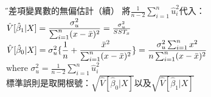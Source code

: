 \documentclass[xcolor=dvipsnames]{beamer}
\begin{document}
\begin{frame}{\H 誤差項變異數的無偏估計（續）}
將$ \frac{1}{n-2}\sum\limits_{i=1}^{n}\hat{u}_{i}^2 $代入：\\
$\hat{V}[\hat{\beta}_{1}|X]=\mathlarger{\frac{\sigma_{u}^{2}}{\sum_{i=1}^{n}(x-\bar{x})^2}}=\frac{\sigma_{u}^{2}}{SST_{x}}$\\
$\hat{V}[\hat{\beta}_{0}|X]=\sigma_{u}^{2}\mathlarger{\{\frac{1}{n}+\frac{\bar{x}^2}{\sum_{i=1}^{n}(x-\bar{x})^2}}\}=\mathlarger{\frac{\sigma_{u}^2\sum_{i=1}^{n}x^2}{n\sum_{i=1}^{n}(x-\bar{x})^2}}$\\
$\mathrm{where}$ $\sigma_{u}^{2}=\frac{1}{n-2}\sum\limits_{i=1}^{n}\hat{u}_{i}^2$\\
\medskip
標準誤則是取開根號：$\sqrt{\hat{V}[\hat{\beta}_{0}|X]} $以及$\sqrt{\hat{V}[\hat{\beta}_{1}|X]}$
\end{frame}
\end{document}
